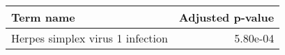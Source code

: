 \begin{tabular}{lr}
\toprule
                       Term name &  Adjusted p-value \\
\midrule
Herpes simplex virus 1 infection &          5.80e-04 \\
\bottomrule
\end{tabular}
